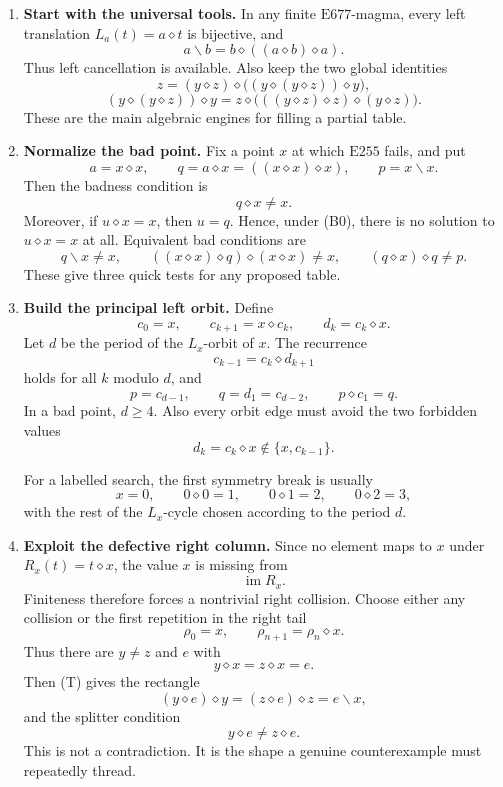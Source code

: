 \documentclass[12pt]{article}
\newcommand{\op}{\diamond}
\newcommand{\E}[1]{\mathrm{E#1}}
\newcommand{\im}{\operatorname{im}}
\theoremstyle{definition}
\begin{document}
\begin{enumerate}[label=\textbf{\arabic*.}]
\item \textbf{Start with the universal tools.}
In any finite $\E{677}$-magma, every left translation $L_a(t)=a\op t$ is bijective, and
\[
a\backslash b=b\op((a\op b)\op a). \tag{L}
\]
Thus left cancellation is available.  Also keep the two global identities
\[
z=(y\op z)\op\bigl((y\op(y\op z))\op y\bigr), \tag{T}
\]
\[
(y\op(y\op z))\op y
=z\op\bigl(((y\op z)\op z)\op(y\op z)\bigr). \tag{K}
\]
These are the main algebraic engines for filling a partial table.

\item \textbf{Normalize the bad point.}
Fix a point $x$ at which $\E{255}$ fails, and put
\[
a=x\op x,
\qquad
q=a\op x=((x\op x)\op x),
\qquad
p=x\backslash x.
\]
Then the badness condition is
\[
q\op x\ne x. \tag{B0}
\]
Moreover, if $u\op x=x$, then $u=q$.  Hence, under (B0), there is no solution to
$u\op x=x$ at all.  Equivalent bad conditions are
\[
q\backslash x\ne x,
\qquad
((x\op x)\op q)\op(x\op x)\ne x,
\qquad
(q\op x)\op q\ne p. \tag{B1}
\]
These give three quick tests for any proposed table.

\item \textbf{Build the principal left orbit.}
Define
\[
c_0=x,
\qquad
c_{k+1}=x\op c_k,
\qquad
d_k=c_k\op x.
\]
Let $d$ be the period of the $L_x$-orbit of $x$.  The recurrence
\[
c_{k-1}=c_k\op d_{k+1} \tag{O}
\]
holds for all $k$ modulo $d$, and
\[
p=c_{d-1},
\qquad
q=d_1=c_{d-2},
\qquad
p\op c_1=q. \tag{O1}
\]
In a bad point, $d\ge4$.  Also every orbit edge must avoid the two forbidden values
\[
d_k=c_k\op x\notin\{x,c_{k-1}\}. \tag{O2}
\]

For a labelled search, the first symmetry break is usually
\[
x=0,
\qquad
0\op0=1,
\qquad
0\op1=2,
\qquad
0\op2=3,
\]
with the rest of the $L_x$-cycle chosen according to the period $d$.

\item \textbf{Exploit the defective right column.}
Since no element maps to $x$ under $R_x(t)=t\op x$, the value $x$ is missing from
\[
\im R_x.
\]
Finiteness therefore forces a nontrivial right collision.  Choose either any collision
or the first repetition in the right tail
\[
\rho_0=x,
\qquad
\rho_{n+1}=\rho_n\op x.
\]
Thus there are $y\ne z$ and $e$ with
\[
y\op x=z\op x=e. \tag{C0}
\]
Then (T) gives the rectangle
\[
(y\op e)\op y=(z\op e)\op z=e\backslash x, \tag{C1}
\]
and the splitter condition
\[
y\op e\ne z\op e. \tag{C2}
\]
This is not a contradiction.  It is the shape a genuine counterexample must repeatedly
thread.


\end{enumerate}
\end{document}
